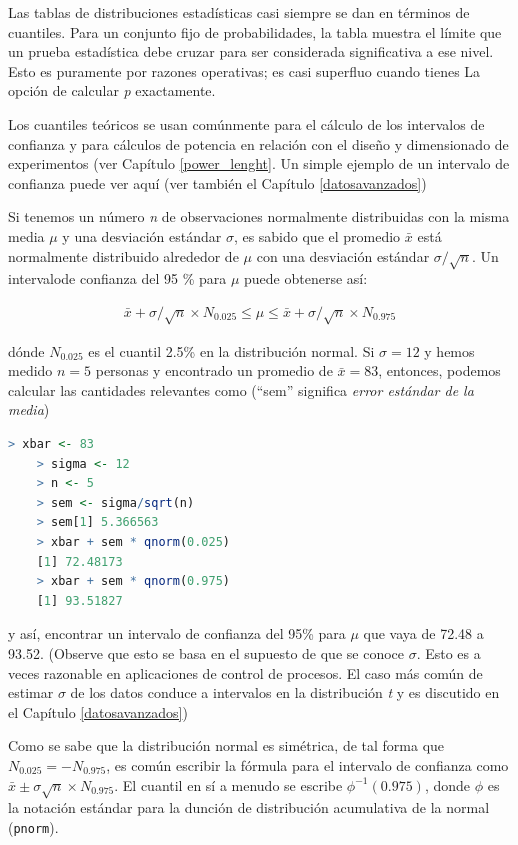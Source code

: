 Las tablas de distribuciones estadísticas casi siempre se dan en términos de
cuantiles. Para un conjunto fijo de probabilidades, la tabla muestra el límite que un
prueba estadística debe cruzar para ser considerada significativa a ese nivel.
Esto es puramente por razones operativas; es casi superfluo cuando tienes
La opción de calcular \textit{p} exactamente.

Los cuantiles teóricos se usan comúnmente para el cálculo de los intervalos de
confianza y para cálculos de potencia en relación con el diseño y dimensionado
de experimentos (ver Capítulo \ref{power_lenght}. Un simple ejemplo de un
intervalo de confianza puede ver aquí (ver también el Capítulo
\ref{datosavanzados})

Si tenemos un número \textit{n} de observaciones normalmente distribuidas con la
misma media $\mu$ y una desviación estándar $\sigma$, es sabido que el promedio
$\bar{x}$ está normalmente distribuido alrededor de $\mu$ con una desviación
estándar $\sigma/\sqrt{n}$. Un intervalode confianza del 95 \% para  $\mu$ puede
obtenerse así:

\begingroup
\Large
\begin{gather*}
    \bar{x} + \sigma/\sqrt{n}\times N _{0.025} \leq \mu \leq \bar{x} +\sigma / \sqrt{n} \times N _{0.975}
\end{gather*}
\endgroup

dónde $N _{0.025}$ es el cuantil 2.5\% en la distribución normal. Si $\sigma =
12$ y hemos medido $n = 5$ personas y encontrado un promedio de $\bar{x} = 83$,
entonces, podemos calcular las cantidades relevantes como (``sem'' significa
\textit{error estándar de la media})

\begin{lstlisting}[language=R]
    > xbar <- 83
    > sigma <- 12
    > n <- 5
    > sem <- sigma/sqrt(n)
    > sem[1] 5.366563
    > xbar + sem * qnorm(0.025)
    [1] 72.48173
    > xbar + sem * qnorm(0.975)
    [1] 93.51827
\end{lstlisting}

y así, encontrar un intervalo de confianza del 95\% para $\mu$ que vaya de 72.48
a 93.52. (Observe que esto se basa en el supuesto de que se conoce $\sigma$.
Esto es a veces razonable en aplicaciones de control de procesos. El caso más
común de estimar $\sigma$ de los datos conduce a intervalos en la distribución
\textit{t} y es discutido en el Capítulo \ref{datosavanzados})

Como se sabe que la distribución normal es simétrica, de tal forma que
$N_{0.025} = -N_{0.975}$, es común escribir la fórmula para el intervalo de
confianza como $\bar{x} \pm \sigma \sqrt{n} \times N_{0.975}$. El cuantil en sí
a menudo se escribe $\phi^{-1}(0.975)$, donde $\phi$ es la notación estándar para la
dunción de distribución acumulativa de la normal (\texttt{pnorm}).

